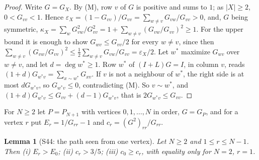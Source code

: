\documentclass[11pt]{amsart}
\newtheorem{lemma}[theorem]{Lemma}
\theoremstyle{definition}
\theoremstyle{remark}
\begin{document}
\begin{proof}
Write $G=G_X$. By (M), row $v$ of $G$ is positive and sums to $1$; as
$|X|\ge2$, $0<G_{vv}<1$. Hence
$\varepsilon_X=(1-G_{vv})/G_{vv}=\sum_{w\ne v}G_{vw}/G_{vv}>0$, and, $G$ being
symmetric, $\kappa_X=\sum_wG_{vw}^2/G_{vv}^2=1+\sum_{w\ne v}(G_{vw}/G_{vv})^2\ge1$.
For the upper bound it is enough to show $G_{wv}\le G_{vv}/2$ for every
$w\ne v$, since then
$\sum_{w\ne v}(G_{vw}/G_{vv})^2\le\frac12\sum_{w\ne v}G_{vw}/G_{vv}=\varepsilon_X/2$.
Let $w^*$ maximize $G_{wv}$ over $w\ne v$, and let $d=\deg w^*\ge1$. Row
$w^*$ of $(I+L)G=I$, in column $v$, reads $(1+d)G_{w^*v}=\sum_{x\sim w^*}G_{xv}$.
If $v$ is not a neighbour of $w^*$, the right side is at most $dG_{w^*v}$,
so $G_{w^*v}\le0$, contradicting (M). So $v\sim w^*$, and
$(1+d)G_{w^*v}\le G_{vv}+(d-1)G_{w^*v}$, that is $2G_{w^*v}\le G_{vv}$.
\end{proof}

For $N\ge2$ let $P=P_{N+1}$ with vertices $0,1,\dots,N$ in order, $G=G_P$,
and for a vertex $r$ put $E_r=1/G_{rr}-1$ and $c_r=(G^2)_{rr}/G_{rr}$.

\begin{lemma}[S44: the path seen from one vertex]\label{lem:S44}
Let $N\ge2$ and $1\le r\le N-1$. Then (i) $E_r>E_0$; (ii) $c_r>3/5$;
(iii) $c_0\ge c_r$, with equality only for $N=2$, $r=1$.
\end{lemma}
\end{document}
